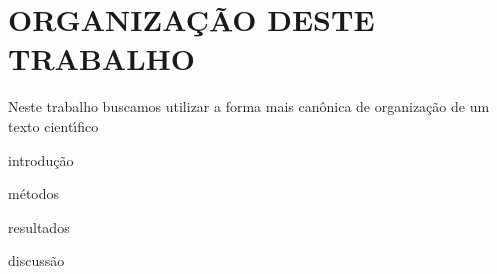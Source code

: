\documentclass[
12pt,		%
openright,	%
twoside,  %
a4paper,			%
chapter=TITLE,		%
english,			%
french,				%
spanish,			%
brazil				%
]{USPSC-classe/USPSC_RedarTex}
\begin{document}






%




\listoffigures*
\cleardoublepage

\listoftables*
\cleardoublepage

\listofquadro*
\cleardoublepage




\tableofcontents*
\cleardoublepage
\textual

\chapter[ORGANIZA\c{C}\~AO DESTE TRABALHO]{ORGANIZA\c{C}\~AO DESTE TRABALHO}\label{ORGANIZA\c{C}\~AO DESTE TRABALHO}
Neste trabalho buscamos utilizar a forma mais can\^onica de organiza\c{c}\~ao de um texto cient\'{\i}fico









\begin{alineas}
\item introdu\c{c}\~ao
\item m\'etodos
\item resultados
\item discuss\~ao
\end{alineas}
\end{document}
